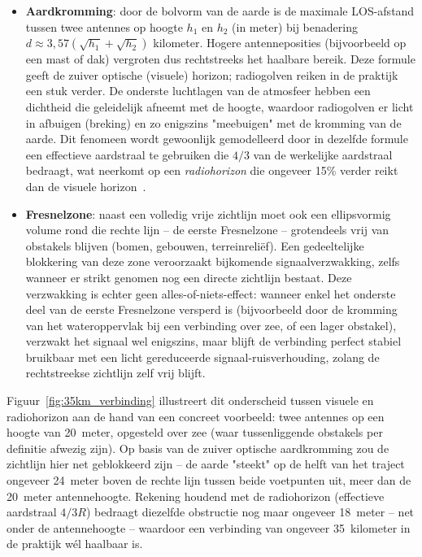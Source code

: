 \begin{itemize}
  \item \textbf{Aardkromming}: door de bolvorm van de aarde is de maximale
        LOS-afstand tussen twee antennes op hoogte $h_1$ en $h_2$ (in meter) bij
        benadering $d \approx 3{,}57 \left(\sqrt{h_1} + \sqrt{h_2}\right)$ kilometer.
        Hogere antenneposities (bijvoorbeeld op een mast of dak) vergroten dus
        rechtstreeks het haalbare bereik. Deze formule geeft de zuiver optische
        (visuele) horizon; radiogolven reiken in de praktijk een stuk verder. De
        onderste luchtlagen van de atmosfeer hebben een dichtheid die geleidelijk
        afneemt met de hoogte, waardoor radiogolven er licht in afbuigen (breking) en
        zo enigszins "meebuigen" met de kromming van de aarde. Dit fenomeen wordt
        gewoonlijk gemodelleerd door in dezelfde formule een effectieve aardstraal te
        gebruiken die $4/3$ van de werkelijke aardstraal bedraagt, wat neerkomt op een
        \textit{radiohorizon} die ongeveer 15\% verder reikt dan de visuele
        horizon~\autocite{Tanenbaum2021}.
  \item \textbf{Fresnelzone}: naast een volledig vrije zichtlijn moet ook een
        ellipsvormig volume rond die rechte lijn -- de eerste Fresnelzone -- grotendeels
        vrij van obstakels blijven (bomen, gebouwen, terreinreliëf). Een gedeeltelijke
        blokkering van deze zone veroorzaakt bijkomende signaalverzwakking, zelfs wanneer
        er strikt genomen nog een directe zichtlijn bestaat. Deze verzwakking is echter
        geen alles-of-niets-effect: wanneer enkel het onderste deel van de eerste
        Fresnelzone versperd is (bijvoorbeeld door de kromming van het wateroppervlak bij
        een verbinding over zee, of een lager obstakel), verzwakt het signaal wel enigszins,
        maar blijft de verbinding perfect stabiel bruikbaar met een licht gereduceerde
        signaal-ruisverhouding, zolang de rechtstreekse zichtlijn zelf vrij blijft.
\end{itemize}

Figuur~\ref{fig:35km_verbinding} illustreert dit onderscheid tussen visuele en
radiohorizon aan de hand van een concreet voorbeeld: twee antennes op een hoogte van
20~meter, opgesteld over zee (waar tussenliggende obstakels per definitie afwezig
zijn). Op basis van de zuiver optische aardkromming zou de zichtlijn hier net
geblokkeerd zijn -- de aarde "steekt" op de helft van het traject ongeveer 24~meter boven
de rechte lijn tussen beide voetpunten uit, meer dan de 20~meter antennehoogte.
Rekening houdend met de radiohorizon (effectieve aardstraal $4/3R$) bedraagt diezelfde
obstructie nog maar ongeveer 18~meter -- net onder de antennehoogte -- waardoor een
verbinding van ongeveer 35~kilometer in de praktijk wél haalbaar is.

